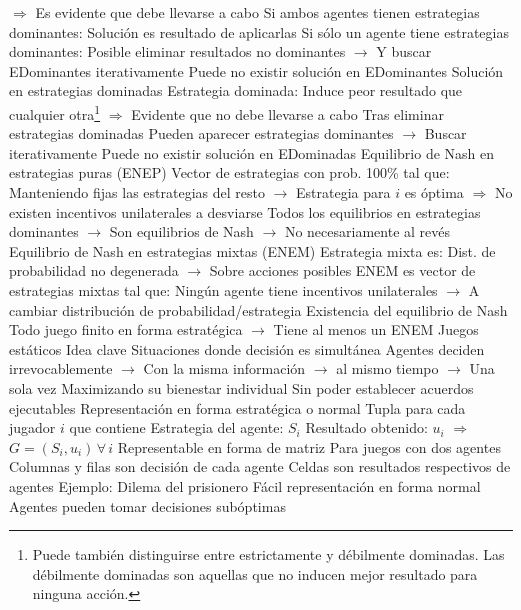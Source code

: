 \documentclass{nuevotema}
\begin{document}
\begin{esquemal}
				\4[] $\Rightarrow$ Es evidente que debe llevarse a cabo
				\4 Si ambos agentes tienen estrategias dominantes:
				\4[] Solución es resultado de aplicarlas
				\4 Si sólo un agente tiene estrategias dominantes:
				\4[] Posible eliminar resultados no dominantes
				\4[] $\to$ Y buscar EDominantes iterativamente
				\4 Puede no existir solución en EDominantes
			\3 Solución en estrategias dominadas
				\4 Estrategia dominada:
				\4[] Induce peor resultado que cualquier otra\footnote{Puede también distinguirse entre estrictamente y débilmente dominadas. Las débilmente dominadas son aquellas que no inducen mejor resultado para ninguna acción.}
				\4[] $\Rightarrow$ Evidente que no debe llevarse a cabo
				\4 Tras eliminar estrategias dominadas
				\4[] Pueden aparecer estrategias dominantes
				\4[] $\to$ Buscar iterativamente
				\4 Puede no existir solución en EDominadas
			\3 Equilibrio de Nash en estrategias puras (ENEP)
				\4 Vector de estrategias con prob. 100\% tal que:
				\4[] Manteniendo fijas las estrategias del resto
				\4[] $\to$ Estrategia para $i$ es óptima
				\4[] $\Rightarrow$ No existen incentivos unilaterales a desviarse
				\4 Todos los equilibrios en estrategias dominantes
				\4[] $\to$ Son equilibrios de Nash
				\4[] $\to$ No necesariamente al revés
			\3 Equilibrio de Nash en estrategias mixtas (ENEM)
				\4 Estrategia mixta es:
				\4[] Dist. de probabilidad no degenerada
				\4[] $\to$ Sobre acciones posibles
				\4 ENEM es vector de estrategias mixtas tal que:
				\4[] Ningún agente tiene incentivos unilaterales
				\4[] $\to$ A cambiar distribución de probabilidad/estrategia
			\3 Existencia del equilibrio de Nash
				\4[] Todo juego finito en forma estratégica
				\4[] $\to$ Tiene al menos un ENEM
		\2 Juegos estáticos
			\3 Idea clave
				\4 Situaciones donde decisión es simultánea
				\4 Agentes deciden irrevocablemente
				\4[] $\to$ Con la misma información
				\4[] $\to$ al mismo tiempo
				\4[] $\to$ Una sola vez
				\4[] Maximizando su bienestar individual
				\4[] Sin poder establecer acuerdos ejecutables
			\3 Representación en forma estratégica o normal
				\4 Tupla para cada jugador $i$ que contiene
				\4[] Estrategia del agente: $S_i$
				\4[] Resultado obtenido: $u_i$
				\4[] $\Rightarrow$ $G=(S_i, u_i) \, \forall \, i$
				\4 Representable en forma de matriz
				\4[] Para juegos con dos agentes
				\4[] Columnas y filas son decisión de cada agente
				\4[] Celdas son resultados respectivos de agentes
			\3 Ejemplo: Dilema del prisionero
				\4 Fácil representación en forma normal
				\4 Agentes pueden tomar decisiones subóptimas

\end{esquemal}
\end{document}
